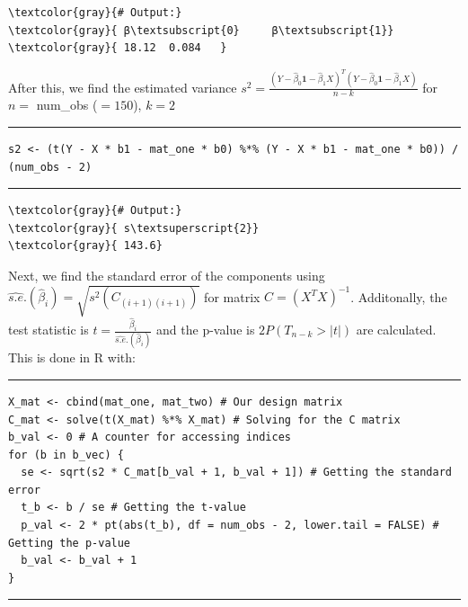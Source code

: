 \documentclass{article}
\begin{document}
\begin{Verbatim}[commandchars=\\\{\}]
\textcolor{gray}{# Output:}
\textcolor{gray}{ β\textsubscript{0}     β\textsubscript{1}}
\textcolor{gray}{ 18.12  0.084   }
\end{Verbatim}
After this, we find the estimated variance $s^2 = \frac{(Y - \hat{\beta}_0\mathbf{1} - \hat{\beta }_1 X)^T(Y - \hat{\beta}_0\mathbf{1} - \hat{\beta }_1 X)}{n-k}$ for $n=$ num\_obs ($= 150$), $k = 2$
\par\noindent\rule{\textwidth}{0.4pt}
\vspace{-25pt} %
\begin{verbatim}
s2 <- (t(Y - X * b1 - mat_one * b0) %*% (Y - X * b1 - mat_one * b0)) / (num_obs - 2)
\end{verbatim}
\vspace{-15pt} %
\par\noindent\rule{\textwidth}{0.4pt}
\begin{Verbatim}[commandchars=\\\{\}]
\textcolor{gray}{# Output:}
\textcolor{gray}{ s\textsuperscript{2}}
\textcolor{gray}{ 143.6}
\end{Verbatim}
Next, we find the standard error of the components using $\widehat{s.e}.(\hat{\beta}_i) = \sqrt{s^2 (C_{(i+1)(i+1)})}$ for matrix $C = (X^T X)^{-1}$. 
 Additonally, the test statistic is $t = \frac{\hat{\beta}_i}{\widehat{s.e}.(\hat{\beta}_i)}$ and the p-value is $2P(T_{n-k} > |t|)$ are calculated. This is done in R with:
\par\noindent\rule{\textwidth}{0.4pt}
\vspace{-25pt} %
\begin{verbatim}
X_mat <- cbind(mat_one, mat_two) # Our design matrix
C_mat <- solve(t(X_mat) %*% X_mat) # Solving for the C matrix
b_val <- 0 # A counter for accessing indices
for (b in b_vec) {
  se <- sqrt(s2 * C_mat[b_val + 1, b_val + 1]) # Getting the standard error
  t_b <- b / se # Getting the t-value
  p_val <- 2 * pt(abs(t_b), df = num_obs - 2, lower.tail = FALSE) # Getting the p-value
  b_val <- b_val + 1
}
\end{verbatim}
\vspace{-15pt} %
\par\noindent\rule{\textwidth}{0.4pt}
\end{document}
